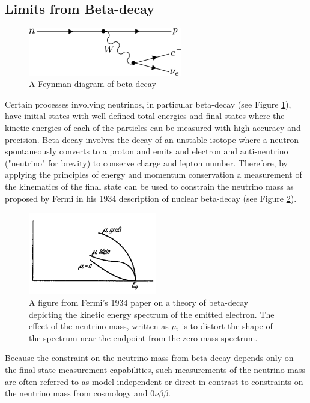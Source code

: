 \subsection{Limits from Beta-decay}

\begin{figure}[htbp]
    \centering
    \includegraphics*[width=0.6\textwidth]{figs/Chapter-2/230717_betadecay.png}
    \caption{\label{fig:chap2-beta-decay-diagram} A Feynman diagram of beta decay}
\end{figure}

Certain processes involving neutrinos, in particular beta-decay (see Figure \ref{fig:chap2-beta-decay-diagram}), have initial states with well-defined total energies and final states where the kinetic energies of each of the particles can be measured with high accuracy and precision. Beta-decay involves the decay of an unstable isotope where a neutron spontaneously converts to a proton and emits and electron and anti-neutrino ("neutrino" for brevity) to conserve charge and lepton number. Therefore, by applying the principles of energy and momentum conservation a measurement of the kinematics of the final state can be used to constrain the neutrino mass as proposed by Fermi in his 1934 description of nuclear beta-decay (see Figure \ref{fig:chap2-fermi-original-b-spectrum}).
\begin{figure}[htbp]
    \centering
    \includegraphics[width=0.5\textwidth]{figs/Chapter-2/Fermi.png}
    \caption{A figure from Fermi's 1934 paper on a theory of beta-decay depicting the kinetic energy spectrum of the emitted electron. The effect of the neutrino mass, written as $\mu$, is to distort the shape of the spectrum near the endpoint from the zero-mass spectrum.}
    \label{fig:chap2-fermi-original-b-spectrum}
\end{figure}
Because the constraint on the neutrino mass from beta-decay depends only on the final state measurement capabilities, such measurements of the neutrino mass are often referred to as model-independent or direct in contrast to constraints on the neutrino mass from cosmology and $0\nu\beta\beta$.

